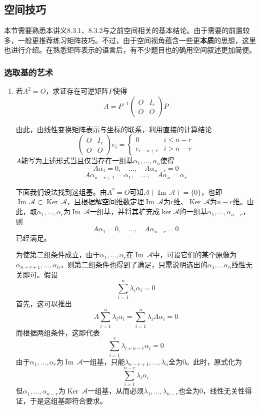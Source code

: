 \documentclass[a4paper,UTF8,fontset=windows]{ctexart}
\DeclareMathOperator{\im}{Im\,}
\DeclareMathOperator{\Ker}{Ker\,}
\newcommand*{\ma}{\mathcal{A}}
\newcommand*{\note}{\noindent *}
\begin{document}
\subsection{空间技巧}
\note 本节需要熟悉本讲义8.3.1、8.3.2与之前空间相关的基本结论。由于需要的前置较多，一般更推荐练习矩阵技巧。不过，由于空间视角蕴含一些更\textbf{本质}的思想，这里也进行介绍。在熟悉矩阵表示的语言后，有不少题目也的确用空间叙述更加简便。

\subsubsection{选取基的艺术}
\begin{enumerate}
    \item 若$A^2=O$，求证存在可逆矩阵$P$使得
    $$A=P^{-1}\begin{pmatrix}O&I_r\\O&O\end{pmatrix}P$$

    由此，由线性变换矩阵表示与坐标的联系，利用直接的计算结论
    $$\begin{pmatrix}O&I_r\\O&O\end{pmatrix}e_i=\begin{cases}0&i\le n-r\\e_{i-n+r}&i>n-r\end{cases}$$
    $A$能写为上述形式当且仅当存在一组基$\alpha_1,\dots,\alpha_n$使得
    $$A\alpha_1=0,\quad\dots,\quad A\alpha_{n-r}=0$$
    $$A\alpha_{n-r+1}=\alpha_1,\quad\dots,\quad A\alpha_n=\alpha_r$$

    下面我们设法找到这组基。由$A^2=O$可知$\ma(\im\ma)=\{0\}$，也即$\im\ma\subset\Ker\ma$，且根据解空间维数定理$\im\ma$为$r$维、$\Ker\ma$为$n-r$维。由此，取$\alpha_1,\dots,\alpha_r$为$\im\ma$一组基，并将其扩充成$\ker\ma$的一组基$\alpha_1,\dots,\alpha_{n-r}$，则
    $$A\alpha_1=0,\quad\dots,\quad A\alpha_{n-r}=0$$
    已经满足。

    为使第二组条件成立，由于$\alpha_1,\dots,\alpha_r$在$\im\ma$中，可设它们的某个原像为$\alpha_{n-r+1},\dots,\alpha_n$，则第二组条件也得到了满足，只需说明选出的$\alpha_1,\dots\alpha_n$线性无关即可。假设
    $$\sum_{i=1}^n\lambda_i\alpha_i=0$$
    首先，这可以推出
    $$A\sum_{i=1}^n\lambda_i\alpha_i=\sum_{i=1}^n\lambda_iA\alpha_i=0$$
    而根据两组条件，这即代表
    $$\sum_{i=1}^r\lambda_{i+n-r}\alpha_i=0$$
    由于$\alpha_1,\dots,\alpha_r$为$\im\ma$一组基，只能$\lambda_{n-r+1},\dots,\lambda_n$全为0。此时，原式化为
    $$\sum_{i=1}^{n-r}\lambda_i\alpha_i$$
    但$\alpha_1,\dots,\alpha_{n-r}$为$\Ker\ma$一组基，从而必须$\lambda_1,\dots,\lambda_{n-r}$也全为0，线性无关性得证，于是这组基即符合要求。


\end{enumerate}
\end{document}
